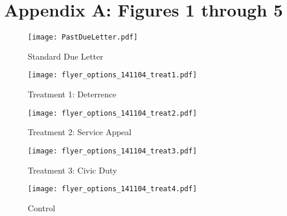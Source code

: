 \documentclass[12pt,titlepage]{article}
\begin{document}
\bigskip
\bigskip

\section*{Appendix A: Figures 1 through 5}
 \newpage
 
\begin{figure}[htpb]
\begin{center}
\caption{Standard Due Letter}
\bigskip
\texttt{[image: PastDueLetter.pdf]}
\end{center}
\end{figure}
\newpage
\begin{figure}[htpb]
\begin{center}
\caption{Treatment 1: Deterrence}
\bigskip
\texttt{[image: flyer\_options\_141104\_treat1.pdf]}
\end{center}
\end{figure}
\newpage
\begin{figure}[htpb]
\begin{center}
\caption{Treatment 2: Service Appeal}
\bigskip
\texttt{[image: flyer\_options\_141104\_treat2.pdf]}
\end{center}
\end{figure}
\newpage
\begin{figure}[htpb]
\begin{center}
\caption{Treatment 3: Civic Duty}
\bigskip
\texttt{[image: flyer\_options\_141104\_treat3.pdf]}
\end{center}
\end{figure}
\newpage
\begin{figure}[htpb]
\begin{center}
\caption{Control}
\bigskip
\texttt{[image: flyer\_options\_141104\_treat4.pdf]}
\end{center}
\end{figure}
\end{document}

